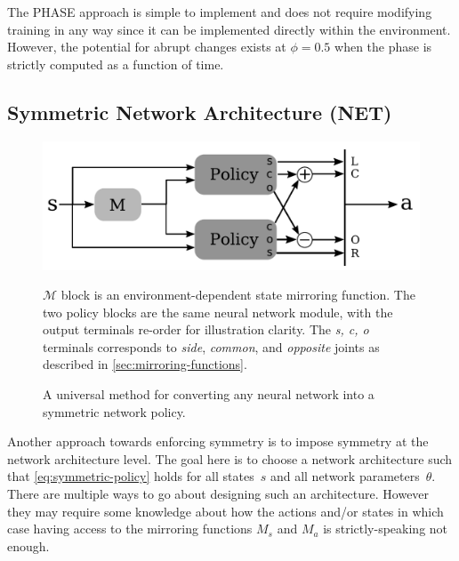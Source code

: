 The PHASE approach is simple to implement and does not require modifying training in any way 
since it can be implemented directly within the environment. 
However, the potential for abrupt changes exists at $\phi=0.5$ when the 
phase is strictly computed as a function of time.

\subsection{Symmetric Network Architecture (NET)}

\begin{figure}%
  \centering
  \includegraphics[width=0.9\columnwidth]{symmetry_figures/net_architecture_2.pdf}
  \caption{A universal method for converting any neural network into a symmetric network policy.}{$\mathcal{M}$ block is an environment-dependent state mirroring function. The two policy blocks are the same neural network module, with the output terminals re-order for illustration clarity.  The \textit{s, c, o} terminals corresponds to \textit{side}, \textit{common}, and \textit{opposite} joints as described in \autoref{sec:mirroring-functions}.}
  \label{fig:net-architecture}
\end{figure}

Another approach towards enforcing symmetry is to impose symmetry at the network architecture level. 
The goal here is to choose a network architecture such that \autoref{eq:symmetric-policy} 
holds for all states~$s$ and all network parameters~$\theta$.
There are multiple ways to go about designing such an architecture.
However they may require some knowledge about how the actions and/or states 
in which case having access to the mirroring functions $M_s$ and $M_a$ is strictly-speaking not enough.

